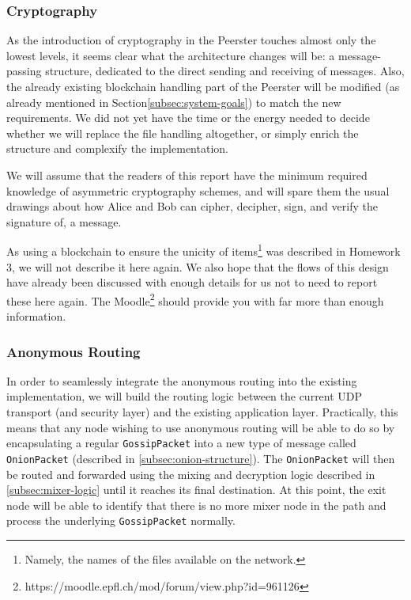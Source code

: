 \documentclass[11pt, a4paper]{article}
\begin{document}


        \subsubsection{Cryptography}

            As the introduction of cryptography in the Peerster touches almost only the lowest levels, it seems clear what the architecture changes will be: a message-passing structure, dedicated to the direct sending and receiving of messages.
            Also, the already existing blockchain handling part of the Peerster will be modified (as already mentioned in Section\ref{subsec:system-goals}) to match the new requirements.
            We did not yet have the time or the energy needed to decide whether we will replace the file handling altogether, or simply enrich the structure and complexify the implementation.

            We will assume that the readers of this report have the minimum required knowledge of asymmetric cryptography schemes, and will spare them the usual drawings about how Alice and Bob can cipher, decipher, sign, and verify the signature of, a message.

            As using a blockchain to ensure the unicity of items\footnote{Namely, the names of the files available on the network.} was described in Homework 3, we will not describe it here again.
            We also hope that the flows of this design have already been discussed with enough details for us not to need to report these here again. The Moodle\footnote{https://moodle.epfl.ch/mod/forum/view.php?id=961126} should provide you with far more than enough information.

        \subsubsection{Anonymous Routing}

            In order to seamlessly integrate the anonymous routing into the existing implementation, we will build the routing logic between the current UDP transport (and security layer) and the existing application layer.
            Practically, this means that any node wishing to use anonymous routing will be able to do so by encapsulating a regular \texttt{GossipPacket} into a new type of message called \texttt{OnionPacket} (described in \ref{subsec:onion-structure}).
            The \texttt{OnionPacket} will then be routed and forwarded using the mixing and decryption logic described in \ref{subsec:mixer-logic} until it reaches its final destination.
            At this point, the exit node will be able to identify that there is no more mixer node in the path and process the underlying \texttt{GossipPacket} normally.
\end{document}
